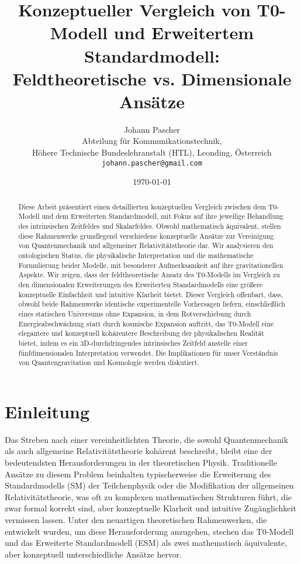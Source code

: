 \documentclass[12pt,a4paper]{article}
\begin{document}
	
	\title{Konzeptueller Vergleich von T0-Modell und Erweitertem Standardmodell: \\Feldtheoretische vs. Dimensionale Ansätze}
	\author{Johann Pascher\\
		Abteilung für Kommunikationstechnik, \\Höhere Technische Bundeslehranstalt (HTL), Leonding, Österreich\\
		\texttt{johann.pascher@gmail.com}}
	\date{\today}
	
	\maketitle
	
	\begin{abstract}
		Diese Arbeit präsentiert einen detaillierten konzeptuellen Vergleich zwischen dem T0-Modell und dem Erweiterten Standardmodell, mit Fokus auf ihre jeweilige Behandlung des intrinsischen Zeitfeldes und Skalarfeldes. Obwohl mathematisch äquivalent, stellen diese Rahmenwerke grundlegend verschiedene konzeptuelle Ansätze zur Vereinigung von Quantenmechanik und allgemeiner Relativitätstheorie dar. Wir analysieren den ontologischen Status, die physikalische Interpretation und die mathematische Formulierung beider Modelle, mit besonderer Aufmerksamkeit auf ihre gravitationellen Aspekte. Wir zeigen, dass der feldtheoretische Ansatz des T0-Modells im Vergleich zu den dimensionalen Erweiterungen des Erweiterten Standardmodells eine größere konzeptuelle Einfachheit und intuitive Klarheit bietet. Dieser Vergleich offenbart, dass, obwohl beide Rahmenwerke identische experimentelle Vorhersagen liefern, einschließlich eines statischen Universums ohne Expansion, in dem Rotverschiebung durch Energieabschwächung statt durch kosmische Expansion auftritt, das T0-Modell eine elegantere und konzeptuell kohärentere Beschreibung der physikalischen Realität bietet, indem es ein 3D-durchdringendes intrinsisches Zeitfeld anstelle einer fünfdimensionalen Interpretation verwendet. Die Implikationen für unser Verständnis von Quantengravitation und Kosmologie werden diskutiert.
	\end{abstract}
	\newpage
	\tableofcontents
	\newpage
	\section{Einleitung}
	\label{sec:introduction}
	
	Das Streben nach einer vereinheitlichten Theorie, die sowohl Quantenmechanik als auch allgemeine Relativitätstheorie kohärent beschreibt, bleibt eine der bedeutendsten Herausforderungen in der theoretischen Physik. Traditionelle Ansätze zu diesem Problem beinhalten typischerweise die Erweiterung des Standardmodells (SM) der Teilchenphysik oder die Modifikation der allgemeinen Relativitätstheorie, was oft zu komplexen mathematischen Strukturen führt, die zwar formal korrekt sind, aber konzeptuelle Klarheit und intuitive Zugänglichkeit vermissen lassen. Unter den neuartigen theoretischen Rahmenwerken, die entwickelt wurden, um diese Herausforderung anzugehen, stechen das T0-Modell und das Erweiterte Standardmodell (ESM) als zwei mathematisch äquivalente, aber konzeptuell unterschiedliche Ansätze hervor.
	
\end{document}
